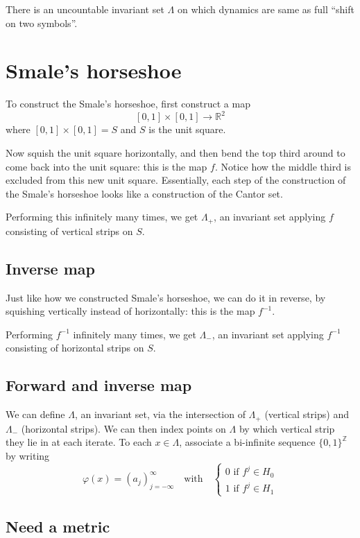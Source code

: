\documentclass{article}
\begin{document}
There is an uncountable invariant set $\Lambda$ on which dynamics are same as full ``shift on two symbols''.

\section{Smale's horseshoe}

To construct the Smale's horseshoe, first construct a map 
\[
[0,1]\times [0,1] \to \mathbb{R}^2
\]
where $[0,1]\times [0,1] =S$ and $S$ is the unit square.

Now squish the unit square horizontally, and then bend the top third around to come back into the unit square: this is the map $f$. Notice how the middle third is excluded from this new unit square. Essentially, each step of the construction of the Smale's horseshoe looks like a construction of the Cantor set.

Performing this infinitely many times, we get $\Lambda_+$, an invariant set applying $f$ consisting of vertical strips on $S$.

\subsection{Inverse map}

Just like how we constructed Smale's horseshoe, we can do it in reverse, by squishing vertically instead of horizontally: this is the map $f^{-1}$.

Performing $f^{-1}$ infinitely many times, we get $\Lambda_-$, an invariant set applying $f^{-1}$ consisting of horizontal strips on $S$.

\subsection{Forward and inverse map}

We can define $\Lambda$, an invariant set, via the intersection of $\Lambda_+$ (vertical strips) and $\Lambda_-$ (horizontal strips). We can then index points on $\Lambda$ by which vertical strip they lie in at each iterate. To each $x\in\Lambda$, associate a bi-infinite sequence $\{0,1\}^{\mathbb{Z}}$ by writing 
\[
\varphi(x) = (a_j)^\infty_{j=-\infty} \quad \text{with} \quad \begin{cases}
    0 \text{ if } f^j\in H_0 \\
    1 \text{ if } f^j\in H_1
\end{cases}
\]

\subsection{Need a metric}
\end{document}
